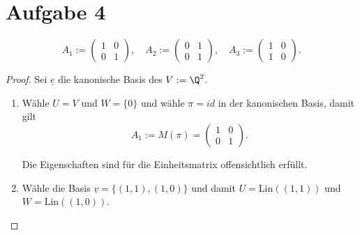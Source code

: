 \documentclass{article}
\begin{document}
    \section*{Aufgabe 4}
    \[
    A_1 := \begin{pmatrix} 1 & 0 \\ 0 & 1 \end{pmatrix}, \quad
    A_2 := \begin{pmatrix} 0 & 1 \\ 0 & 1 \end{pmatrix}, \quad
    A_3 := \begin{pmatrix} 1 & 0 \\ 1 & 0 \end{pmatrix} 
.\] 
\begin{proof}
Sei $\underline{e}$ die kanonische Basis des $V := \Q^{2}$.
\begin{enumerate}
    \item Wähle $U = V$ und
        $W = \{0\} $ und wähle $\pi = id$ in der kanonischen Basis, damit
        gilt
        \[
        A_1 := M(\pi) = \begin{pmatrix} 1 & 0 \\ 0 & 1 \end{pmatrix} 
        .\] 

        Die Eigenschaften sind für die Einheitsmatrix offensichtlich
        erfüllt.
    \item Wähle die Basis  $\underline{v} =\{(1, 1), (1, 0)\}$ und damit
        $U = \text{Lin}((1,1))$ und $W = \text{Lin}((1,0))$.


\end{enumerate}
\end{proof}
\end{document}

